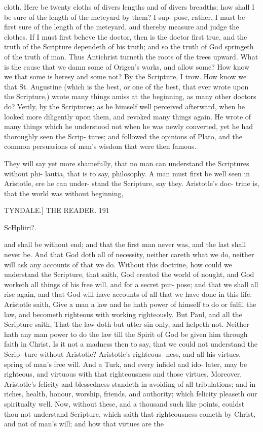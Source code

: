 \documentclass{custom}
\begin{document}
cloth. Here be twenty cloths of divers lengths 
and of divers breadths; how shall I be sure of 
the length of the meteyard by them? I sup- 
pose, rather, I must be first sure of the length of 
the meteyard, aud thereby measure and judge 
the clothes. If I must first beheve the doctor,
then is the doctor first true, and the truth of the 
Scripture dependeth of his truth; and so the 
truth of God springeth of the truth of man. 
Thus Antichrist turneth the roots of the trees 
upward. What is the cause that we damn 
some of Origen's works, and allow some? How 
know we that some is heresy and some not? 
By the Scripture, I trow. How know we that 
St. Augustine (which is the best, or one of the 
best, that ever wrote upon the Scripture,) wrote 
many things amiss at the beginning, as many 
other doctors do? Verily, by the Scriptures; 
as he himself well perceived afterward, when he 
looked more diligently upon them, and revoked 
many things again. He wrote of many things 
which he understood not when he was newly 
converted, yet he had thoroughly seen the Scrip- 
tures; and followed the opinions of Plato, and 
the common persuasions of man's wisdom that 
were then famous. 

They will say yet more shamefully, that no 
man can understand the Scriptures without phi- 
lautia, that is to say, philosophy. A man must 
first be well seen in Aristotle, ere he can under- 
stand the Scripture, say they. Aristotle's doc- 
trine is, that the world was without beginning, 


TYNDALE.]
THE READER.
191

ScHpliiri?. 

and shall be without end; and that the first man 
never was, and the last shall never be. And 
that God doth all of necessity, neither careth 
what we do, neither will ask any accounts of 
that we do. Without this doctrine, how could 
we understand the Scripture, that saith, God 
created the world of nought, and God worketh 
all things of his free will, and for a secret pur- 
pose; and that we shall all rise again, and that 
God will have accounts of all that we have done 
in this life. Aristotle saith, Give a man a law
and he hath power of himself to do or fulfil the 
law, and becometh righteous with working 
righteously. But Paul, and all the Scripture
saith, That the law doth but utter sin only, 
and helpeth not. Neither hath any man power 
to do the law till the Spirit of God be given him 
through faith in Christ. Is it not a madness then 
to say, that we could not understand the Scrip- 
ture without Aristotle? Aristotle's righteous-
ness, and all his virtues, spring of man's free 
will. And a Turk, and every infidel and ido- 
later, may be righteous, and virtuous with that 
righteousness and those virtues. Moreover, 
Aristotle's felicity and blessedness standeth in 
avoiding of all tribulations; and in riches, health, 
honour, worship, friends, and authority; which 
felicity pleaseth our spiritualty well. Now, 
without these, and a thousand such like points, 
couldst thou not understand Scripture, which
saith that righteousness cometh by Christ, and 
not of man's will; and how that virtues are the 
\end{document}
